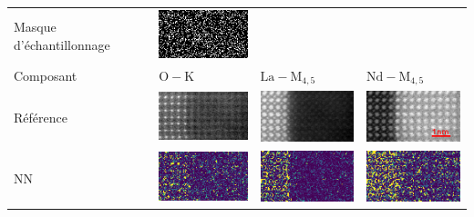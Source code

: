 \setlength{}

\begin{tabular}{m{2cm}*{3}{M{0.24\textwidth}}}
    Masque d'échantillonnage&
    \includegraphics[width=\tmplength]{img/chapitre4/figure9/img/mask.png}&
    &
    \\[30pt]
    Composant&
    {$\mathrm{O-K}$}&
    {$\mathrm{La-M}_{4, 5}$}&
    {$\mathrm{Nd-M}_{4, 5}$}\\
    Référence&
    \includegraphics[width=\tmplength]{img/chapitre4/figure7/HR2_GT_band_0.png}&
    \includegraphics[width=\tmplength]{img/chapitre4/figure7/HR2_GT_band_1.png}&
    \includegraphics[width=\tmplength]{img/chapitre4/figure7/HR2_GT_band_2.png}\\
    NN&
    \includegraphics[width=\tmplength]{img/chapitre4/figure7/R2_NN_band_0.png}&
    \includegraphics[width=\tmplength]{img/chapitre4/figure7/R2_NN_band_1.png}&
    \includegraphics[width=\tmplength]{img/chapitre4/figure7/R2_NN_band_2.png}\\

\end{tabular}

